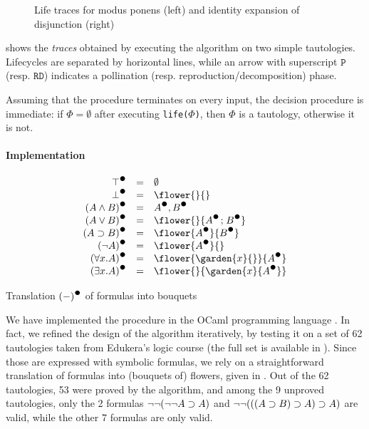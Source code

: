 \begin{figure*}
  
  \caption{Life traces for modus ponens (left) and identity expansion of disjunction (right)}
\end{figure*}

 shows the \emph{traces} obtained by executing the algorithm
on two simple tautologies. Lifecycles are separated by horizontal lines, while
an arrow with superscript $\mathtt{P}$ (resp. $\mathtt{RD}$) indicates a
pollination (resp. reproduction/decomposition) phase.

Assuming that the  procedure terminates on every input, the
decision procedure is immediate: if $\Phi = \emptyset$ after executing
\texttt{life($\Phi$)}, then $\Phi$ is a tautology, otherwise it is not.

\paragraph{Implementation}

\begin{marginfigure}
  $$
  \begin{array}{r@{\quad=\quad}l}
    \dtrans{\top} & \emptyset \\
    \dtrans{\bot} & \flower{}{} \\
    \dtrans{(A \land B)} & \dtrans{A}, \dtrans{B} \\
    \dtrans{(A \lor B)} & \flower{}{\dtrans{A} \sep \dtrans{B}} \\
    \dtrans{(A \limp B)} & \flower{\dtrans{A}}{\dtrans{B}} \\
    \dtrans{(\neg A)} & \flower{\dtrans{A}}{} \\
    \dtrans{(\forall x. A)} & \flower{\garden{x}{{}}}{\dtrans{A}} \\
    \dtrans{(\exists x. A)} & \flower{}{\garden{x}{\dtrans{A}}}
  \end{array}
  $$
  \caption{Translation $\dtrans{(-)}$ of formulas into bouquets}
\end{marginfigure}

We have implemented the  procedure in the OCaml programming
language \cite{flower-auto}. In fact, we refined the design of the algorithm
iteratively, by testing it on a set of 62 tautologies taken from Edukera's logic
course \cite{edukera} (the full set is available in
). Since those are expressed with symbolic formulas,
we rely on a straightforward translation of formulas into (bouquets of) flowers,
given in . Out of the 62 tautologies, 53 were proved by
the algorithm, and among the 9 unproved tautologies, only the 2 formulas
$\neg\neg(\neg\neg A \supset A)$ and $\neg\neg(((A \supset B) \supset A) \supset A)$ are
 valid, while the other 7 formulas are only  valid.

